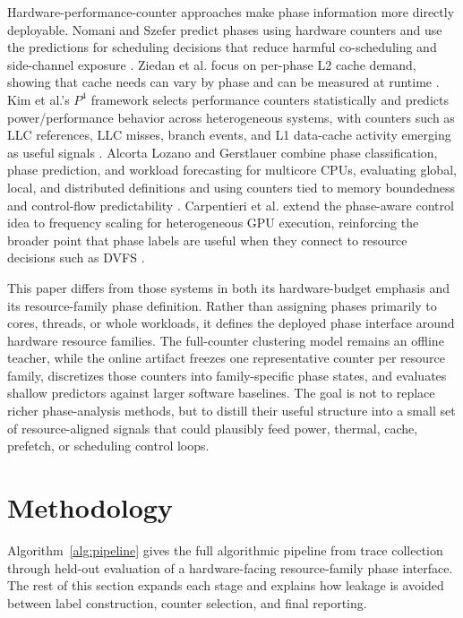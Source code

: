 \documentclass[10pt,twocolumn]{article}
\newcounter{algorithm}
\begin{document}
Hardware-performance-counter approaches make phase information more directly deployable.
Nomani and Szefer predict phases using hardware counters and use the predictions for scheduling decisions that reduce harmful co-scheduling and side-channel exposure \cite{nomani2015predicting}.
Ziedan et al. focus on per-phase L2 cache demand, showing that cache needs can vary by phase and can be measured at runtime \cite{ziedan2016runtime}.
Kim et al.'s $P^4$ framework selects performance counters statistically and predicts power/performance behavior across heterogeneous systems, with counters such as LLC references, LLC misses, branch events, and L1 data-cache activity emerging as useful signals \cite{kim2017p4}.
Alcorta Lozano and Gerstlauer combine phase classification, phase prediction, and workload forecasting for multicore CPUs, evaluating global, local, and distributed definitions and using counters tied to memory boundedness and control-flow predictability \cite{lozano2022phase}.
Carpentieri et al. extend the phase-aware control idea to frequency scaling for heterogeneous GPU execution, reinforcing the broader point that phase labels are useful when they connect to resource decisions such as DVFS \cite{carpentieri2025frequency}.

This paper differs from those systems in both its hardware-budget emphasis and its resource-family phase definition.
Rather than assigning phases primarily to cores, threads, or whole workloads, it defines the deployed phase interface around hardware resource families.
The full-counter clustering model remains an offline teacher, while the online artifact freezes one representative counter per resource family, discretizes those counters into family-specific phase states, and evaluates shallow predictors against larger software baselines.
The goal is not to replace richer phase-analysis methods, but to distill their useful structure into a small set of resource-aligned signals that could plausibly feed power, thermal, cache, prefetch, or scheduling control loops.

\section{Methodology}

Algorithm~\ref{alg:pipeline} gives the full algorithmic pipeline from trace collection through held-out evaluation of a hardware-facing resource-family phase interface.
The rest of this section expands each stage and explains how leakage is avoided between label construction, counter selection, and final reporting.
\end{document}
